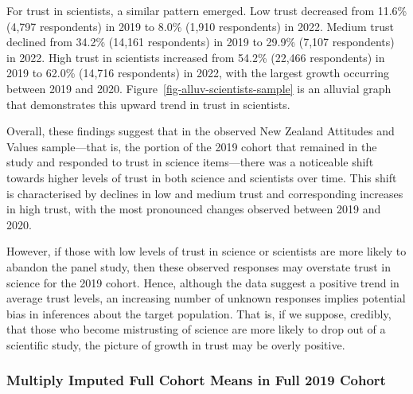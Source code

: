 \documentclass[
  single column]{article}
\begin{document}
For trust in scientists, a similar pattern emerged. Low trust decreased
from 11.6\% (4,797 respondents) in 2019 to 8.0\% (1,910 respondents) in
2022. Medium trust declined from 34.2\% (14,161 respondents) in 2019 to
29.9\% (7,107 respondents) in 2022. High trust in scientists increased
from 54.2\% (22,466 respondents) in 2019 to 62.0\% (14,716 respondents)
in 2022, with the largest growth occurring between 2019 and 2020.
Figure~\ref{fig-alluv-scientists-sample} is an alluvial graph that
demonstrates this upward trend in trust in scientists.

Overall, these findings suggest that in the observed New Zealand
Attitudes and Values sample---that is, the portion of the 2019 cohort
that remained in the study and responded to trust in science
items---there was a noticeable shift towards higher levels of trust in
both science and scientists over time. This shift is characterised by
declines in low and medium trust and corresponding increases in high
trust, with the most pronounced changes observed between 2019 and 2020.

However, if those with low levels of trust in science or scientists are
more likely to abandon the panel study, then these observed responses
may overstate trust in science for the 2019 cohort. Hence, although the
data suggest a positive trend in average trust levels, an increasing
number of unknown responses implies potential bias in inferences about
the target population. That is, if we suppose, credibly, that those who
become mistrusting of science are more likely to drop out of a
scientific study, the picture of growth in trust may be overly positive.

\subsubsection{Multiply Imputed Full Cohort Means in Full 2019
Cohort}\label{multiply-imputed-full-cohort-means-in-full-2019-cohort}
\end{document}

